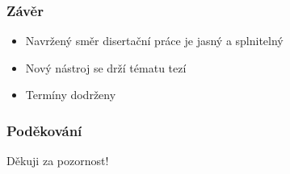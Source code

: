 \documentclass[xcolor=dvipsnames]{beamer}
\begin{document}
\begin{frame}
  \frametitle{Závěr}
  \begin{itemize}
  \item Navržený směr disertační práce je jasný a splnitelný
  \medskip
  \item Nový nástroj se drží tématu tezí
  \medskip
  \item Termíny dodrženy
  \end{itemize}

\end{frame}





\begin{frame}
  \frametitle{Poděkování}
  \begin{center} \LARGE
  Děkuji za pozornost!
  \end{center}

\end{frame}
\end{document}
